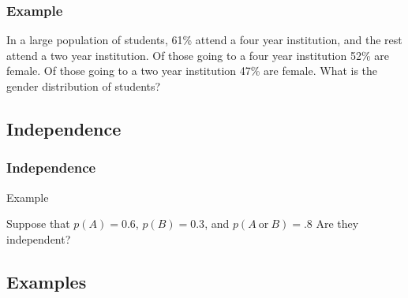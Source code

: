 \begin{frame}
  \frametitle{Example}

    In a large population of students, 61\% attend a four year
    institution, and the rest attend a two year institution. Of those
    going to a four year institution 52\% are female. Of those going
    to a two year institution 47\% are female. What is the gender
    distribution of students?

    \vfill

\end{frame}

\subsection{Independence}

\begin{frame}
  \frametitle{Independence}




\end{frame}

\begin{frame}{Example}

  Suppose that $p(A)=0.6$, $p(B)=0.3$, and $p(A\mathrm{~or~}B)=.8$
  Are they independent?

  \vfill

  
\end{frame}



\subsection{Examples}


